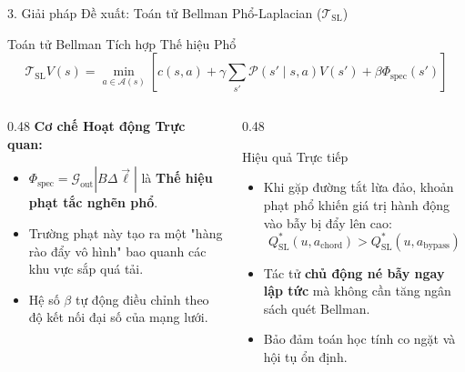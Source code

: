 \documentclass[aspectratio=169, 10pt]{beamer}
\begin{document}
\begin{frame}{3. Giải pháp Đề xuất: Toán tử Bellman Phổ-Laplacian ($\mathcal{T}_{\text{SL}}$)}
    \begin{block}{Toán tử Bellman Tích hợp Thế hiệu Phổ}
        \[
            \mathcal{T}_{\text{SL}} V(s) = \min_{a \in \mathcal{A}(s)} \left[ c(s, a) + \gamma \sum_{s'} \mathcal{P}(s' \mid s, a) V(s') + \beta \Phi_{\text{spec}}(s') \right]
        \]
    \end{block}
    
    \vspace{0.2cm}
    \begin{columns}[T]
        \begin{column}{0.48\textwidth}
            \textbf{Cơ chế Hoạt động Trực quan:}
            \begin{itemize}
                \item $\Phi_{\text{spec}} = \mathcal{G}_{\text{out}} |B \Delta \vec{\ell}|$ là \textbf{Thế hiệu phạt tắc nghẽn phổ}.
                \item Trường phạt này tạo ra một "hàng rào đẩy vô hình" bao quanh các khu vực sắp quá tải.
                \item Hệ số $\beta$ tự động điều chỉnh theo độ kết nối đại số của mạng lưới.
            \end{itemize}
        \end{column}
        
        \begin{column}{0.48\textwidth}
            \begin{exampleblock}{Hiệu quả Trực tiếp}
                \begin{itemize}
                    \item Khi gặp đường tắt lừa đảo, khoản phạt phổ khiến giá trị hành động vào bẫy bị đẩy lên cao:
                    \[
                        Q^*_{\text{SL}}(u, a_{\text{chord}}) > Q^*_{\text{SL}}(u, a_{\text{bypass}})
                    \]
                    \item Tác tử \textbf{chủ động né bẫy ngay lập tức} mà không cần tăng ngân sách quét Bellman.
                    \item Bảo đảm toán học tính co ngặt và hội tụ ổn định.
                \end{itemize}
            \end{exampleblock}
        \end{column}
    \end{columns}
\end{frame}
\end{document}
